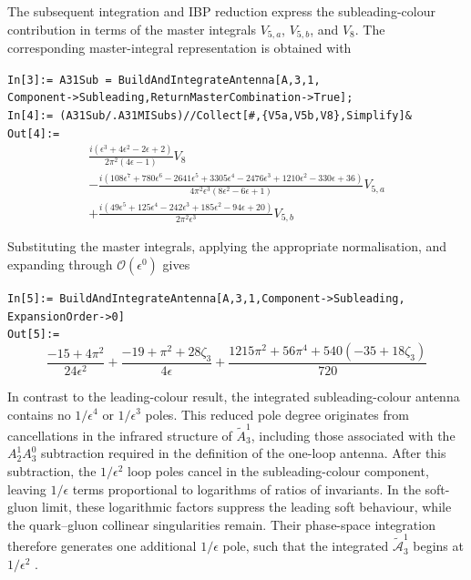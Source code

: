 The subsequent integration and IBP reduction express the subleading-colour
contribution in terms of the master integrals $V_{5,a}$, $V_{5,b}$, and $V_8$. The
corresponding master-integral representation is obtained with

\begin{mdframed}[backgroundcolor=gray!10, linewidth=0pt]
\texttt{In[3]:= A31Sub = BuildAndIntegrateAntenna[A,3,1,\\Component->Subleading,ReturnMasterCombination->True];}\\
\texttt{In[4]:= (A31Sub/.A31MISubs)//Collect[\#,\{V5a,V5b,V8\},Simplify]\&}\\
\hfill
\texttt{Out[4]:=}
    \begin{equation*}
        \begin{gathered}
            \frac{i\left(\epsilon^3+4\epsilon^2-2\epsilon+2\right)}{2\pi^2(4\epsilon-1)}V_8\\
            -\frac{i\left(108\epsilon^7+780\epsilon^6-2641\epsilon^5+3305\epsilon^4-2476\epsilon^3+1210\epsilon^2-330\epsilon+36\right)}{4\pi^2\epsilon^3\left(8\epsilon^2-6\epsilon+1\right)}V_{5,a}\\
            +\frac{i\left(49\epsilon^5+125\epsilon^4-242\epsilon^3+185\epsilon^2-94\epsilon+20\right)}{2\pi^2\epsilon^3}V_{5,b}
        \end{gathered}
    \end{equation*}
\end{mdframed}

Substituting the master integrals, applying the appropriate normalisation, and
expanding through $\mathcal O(\epsilon^0)$ gives

\begin{mdframed}[backgroundcolor=gray!10, linewidth=0pt]
\texttt{In[5]:= BuildAndIntegrateAntenna[A,3,1,Component->Subleading,\\ExpansionOrder->0]}\\
\hfill
\texttt{Out[5]:=}
    \begin{equation*}
        \frac{-15+4\pi^2}{24\epsilon^2}+\frac{-19+\pi^2+28\zeta_3}{4\epsilon}+\frac{1215\pi^2+56\pi^4+540(-35+18\zeta_3)}{720}
    \end{equation*}
\end{mdframed}

In contrast to the leading-colour result, the integrated subleading-colour antenna contains no
$1/\epsilon^4$ or $1/\epsilon^3$ poles. This reduced pole degree originates from cancellations in the
infrared structure of $\tilde A_3^1$, including those associated with the $A_2^1A_3^0$ subtraction
required in the definition of the one-loop antenna. After this subtraction, the $1/\epsilon^2$ loop
poles cancel in the subleading-colour component, leaving $1/\epsilon$ terms proportional to logarithms
of ratios of invariants. In the soft-gluon limit, these logarithmic factors suppress the leading soft
behaviour, while the quark--gluon collinear singularities remain. Their phase-space integration
therefore generates one additional $1/\epsilon$ pole, such that the integrated $\tilde{\mathcal A}_3^1$
begins at $1/\epsilon^2$ \cite{Gehrmann-DeRidder:2005btv}.

